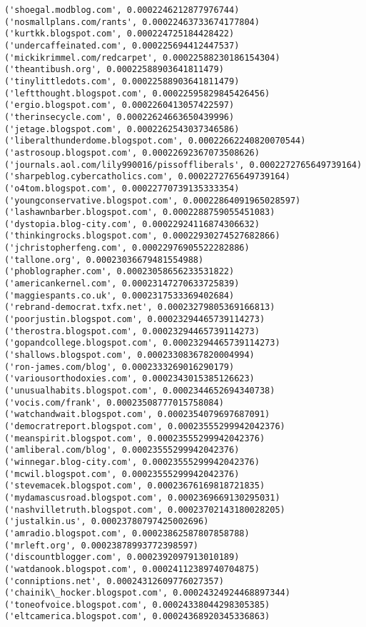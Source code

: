 \documentclass[11pt]{article}
\begin{document}
\begin{Verbatim}[commandchars=\\\{\}]
('shoegal.modblog.com', 0.0002246212877976744)
('nosmallplans.com/rants', 0.00022463733674177804)
('kurtkk.blogspot.com', 0.000224725184428422)
('undercaffeinated.com', 0.000225694412447537)
('mickikrimmel.com/redcarpet', 0.00022588230186154304)
('theantibush.org', 0.00022588903641811479)
('tinylittledots.com', 0.00022588903641811479)
('leftthought.blogspot.com', 0.00022595829845426456)
('ergio.blogspot.com', 0.0002260413057422597)
('therinsecycle.com', 0.00022624663650439996)
('jetage.blogspot.com', 0.0002262543037346586)
('liberalthunderdome.blogspot.com', 0.00022662240820070544)
('astrosoup.blogspot.com', 0.00022692367073508626)
('journals.aol.com/lily990016/pissoffliberals', 0.0002272765649739164)
('sharpeblog.cybercatholics.com', 0.0002272765649739164)
('o4tom.blogspot.com', 0.00022770739135333354)
('youngconservative.blogspot.com', 0.00022864091965028597)
('lashawnbarber.blogspot.com', 0.0002288759055451083)
('dystopia.blog-city.com', 0.00022924116874306632)
('thinkingrocks.blogspot.com', 0.00022930274527682866)
('jchristopherfeng.com', 0.00022976905522282886)
('tallone.org', 0.00023036679481554988)
('phoblographer.com', 0.00023058656233531822)
('americankernel.com', 0.00023147270633725839)
('maggiespants.co.uk', 0.0002317533369402684)
('rebrand-democrat.txfx.net', 0.00023279805369166813)
('poorjustin.blogspot.com', 0.00023294465739114273)
('therostra.blogspot.com', 0.00023294465739114273)
('gopandcollege.blogspot.com', 0.00023294465739114273)
('shallows.blogspot.com', 0.00023308367820004994)
('ron-james.com/blog', 0.0002333269016290179)
('variousorthodoxies.com', 0.0002343015385126623)
('unusualhabits.blogspot.com', 0.0002344652694340738)
('vocis.com/frank', 0.00023508777015758084)
('watchandwait.blogspot.com', 0.0002354079697687091)
('democratreport.blogspot.com', 0.00023555299942042376)
('meanspirit.blogspot.com', 0.00023555299942042376)
('amliberal.com/blog', 0.00023555299942042376)
('winnegar.blog-city.com', 0.00023555299942042376)
('mcwil.blogspot.com', 0.00023555299942042376)
('stevemacek.blogspot.com', 0.00023676169818721835)
('mydamascusroad.blogspot.com', 0.0002369669130295031)
('nashvilletruth.blogspot.com', 0.00023702143180028205)
('justalkin.us', 0.00023780797425002696)
('amradio.blogspot.com', 0.00023862587807858788)
('mrleft.org', 0.00023878993772398597)
('discountblogger.com', 0.0002392097913010189)
('watdanook.blogspot.com', 0.00024112389740704875)
('conniptions.net', 0.00024312609776027357)
('chainik\_hocker.blogspot.com', 0.00024324924468897344)
('toneofvoice.blogspot.com', 0.00024338044298305385)
('eltcamerica.blogspot.com', 0.00024368920345336863)

\end{Verbatim}
\end{document}
